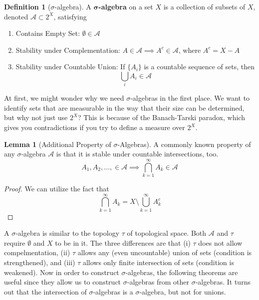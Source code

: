 \documentclass{article}
\theoremstyle{definition}
\newtheorem{lemma}[theorem]{Lemma}
\theoremstyle{remark}
\theoremstyle{definition}
\newtheorem{definition}{Definition}[section]
\begin{document}
\begin{definition}[$\sigma$-algebra]
A $\boldsymbol{\sigma}$\textbf{-algebra} on a set $X$ is a collection of subsets of $X$, denoted $\mathcal{A} \subset 2^X$, satisfying
\begin{enumerate}
    \item Contains Empty Set: $\emptyset \in \mathcal{A}$ 
    \item Stability under Complementation: $A \in \mathcal{A} \implies A^c \in \mathcal{A}$, where $A^c = X - A$ 
    \item Stability under Countable Union: If $\{A_i\}$ is a countable sequence of sets, then 
    \[\bigcup_i A_i \in \mathcal{A}\]
\end{enumerate}
\end{definition}

At first, we might wonder why we need $\sigma$-algebras in the first place. We want to identify sets that are measurable in the way that their size can be determined, but why not just use $2^X$? This is because of the Banach-Tarski paradox, which gives you contradictions if you try to define a measure over $2^X$.  

\begin{lemma}[Additional Property of $\sigma$-Algebras]
A commonly known property of any $\sigma$-algebra $\mathcal{A}$ is that it is stable under countable intersections, too. 
\[A_1, A_2, \ldots, \in \mathcal{A} \implies \bigcap_{k=1}^\infty A_k \in \mathcal{A}\]
\end{lemma}
\begin{proof}
We can utilize the fact that 
\[\bigcap_{k=1}^\infty A_k = X \setminus \bigcup_{k=1}^\infty A_k^c\]
\end{proof}

A $\sigma$-algebra is similar to the topology $\tau$ of topological space. Both $\mathcal{A}$ and $\tau$ require $\emptyset$ and $X$ to be in it. The three differences are that (i) $\tau$ does not allow compelmentation, (ii) $\tau$ allows any (even uncountable) union of sets (condition is strengthened), and (iii) $\tau$ allows only finite intersection of sets (condition is weakened). Now in order to construct $\sigma$-algebras, the following theorems are useful since they allow us to construct $\sigma$-algebras from other $\sigma$-algebras. It turns out that the intersection of $\sigma$-algebras is a $\sigma$-algebra, but not for unions. 
\end{document}

